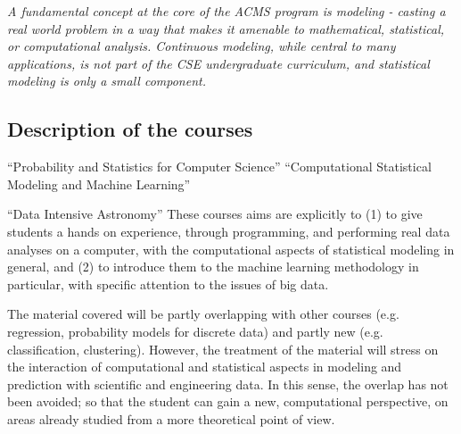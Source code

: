 


{\em A fundamental concept at the core of the ACMS program is modeling - casting a real world problem in a way that makes it amenable to mathematical, statistical, or computational analysis. 
 Continuous modeling, while central to many applications, is not part of the CSE undergraduate curriculum, and statistical modeling is only a small component. }

 

\subsection{Description of the courses}
\label{sec:course-descr}

\bits
\item \statcl ``Probability and Statistics for Computer Science''
``Computational Statistical Modeling and Machine Learning''
\item \astrocl ``Data Intensive Astronomy'' 
\eits
These courses aims are explicitly to (1) to give students a hands on experience, through programming, and performing real data analyses on a computer, with the computational aspects of 
statistical modeling in general, and (2) to introduce them to the  machine learning methodology in particular, with specific attention to the issues of big data.

The material covered will be partly overlapping with other courses
(e.g. regression, probability models for discrete data) and partly new
(e.g. classification, clustering). However, the treatment of the
material will stress on the interaction of computational and
statistical aspects in modeling and prediction with scientific and
engineering data. In this sense, the overlap has not been avoided; so that
the student can gain a new, computational perspective, on areas
already studied from a more theoretical point of view. 

